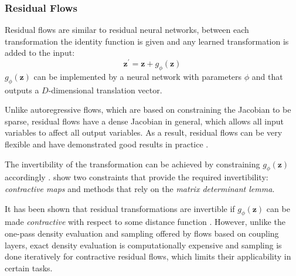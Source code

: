 \documentclass[english]{scrartcl}
\begin{document}
    \subsubsection{Residual Flows}
    Residual flows are similar to residual neural networks, between each transformation the identity function is given and any learned transformation is added to the input:
    \begin{equation}
        \label{eq:res_flow_eq}
        \textbf{z}^{\prime} = \textbf{z} + g_{\phi} (\textbf{z})
    \end{equation}
    $g_{\phi} (\textbf{z})$ can be implemented by a neural network with parameters $\phi$ and that outputs a $D$-dimensional translation vector.

    Unlike autoregressive flows, which are based on constraining the Jacobian to be sparse, residual flows have a dense Jacobian in general, which allows all input variables to affect all output variables.
    As a result, residual flows can be very flexible and have demonstrated good results in practice \citep{chen_residual_2020}.

    The invertibility of the transformation can be achieved by constraining $g_{\phi} (\textbf{z})$ accordingly \citep{behrmann_invertible_2019, chen_residual_2020}.
    \cite{papamakarios_normalizing_2019} show two constraints that provide the required invertibility: \textit{contractive maps} and methods that rely on the \textit{matrix determinant lemma}.

    It has been shown that residual transformations are invertible if $g_{\phi} (\textbf{z})$ can be made \textit{contractive} with respect to some distance function \citep{behrmann_invertible_2019, chen_residual_2020}.
    However, unlike the one-pass density evaluation and sampling offered by flows based on coupling layers, exact density evaluation is computationally expensive and sampling is done iteratively for contractive residual flows, which limits their applicability in certain tasks.
\end{document}
